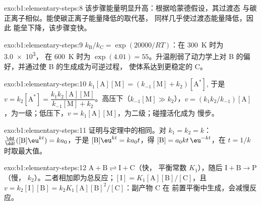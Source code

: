 \begin{solution}{exo:b1:elementary-steps:8}
该步骤能量明显升高：根据哈蒙德假设，其过渡态
与碳正离子相似。能使碳正离子能量降低的取代基，
同样几乎使过渡态能量降低，因此
能垒下降，该步骤变快。
\end{solution}

\begin{solution}{exo:b1:elementary-steps:9}
$k_{\mathrm B}/k_{\mathrm C} = \exp(20000/RT)$：在 \qty{300}{K} 时为 \num{3.0e3}，
在 \qty{600}{K} 时为 $\exp(4.01) = 55$。升温削弱了动力学上对
B 的偏好，并通过使 B 的生成成为可逆过程，
使体系达到更稳定的 C。
\end{solution}

\begin{solution}{exo:b1:elementary-steps:10}
$k_1[\mathrm{A}][\mathrm{M}] = (k_{-1}[\mathrm{M}] + k_2)[\mathrm{A}^*]$,
于是 $v = k_2[\mathrm{A}^*] = \dfrac{k_1k_2[\mathrm{A}][\mathrm{M}]}{k_{-1}[\mathrm{M}]
+ k_2}$。高压下（$k_{-1}[\mathrm{M}] \gg k_2$），$v =
(k_1k_2/k_{-1})[\mathrm{A}]$，为一级；低压下，$v =
k_1[\mathrm{A}][\mathrm{M}]$，为二级；碰撞活化成为
慢步。
\end{solution}

\begin{solution}{exo:b1:elementary-steps:11}
证明与定理中的相同。对 $k_1 = k_2 = k$：
$\frac{\dd}{\dd t}([\mathrm{B}]\eu^{kt}) = ka_0$，于是 $[\mathrm{B}]\eu^{kt} =
ka_0t$，得 $[\mathrm{B}] = a_0kt\,\eu^{-kt}$，在 $t = 1/k$ 时取最大值。
\end{solution}

\begin{solution}{exo:b1:elementary-steps:12}
$\mathrm{A} + \mathrm{B} \rightleftharpoons \mathrm{I} + \mathrm{C}$（快，
平衡常数 $K_1$），随后 $\mathrm{I} + \mathrm{B} \to \mathrm{P}$（慢，
$k_2$）。二者相加即为总反应；$[\mathrm{I}] =
K_1[\mathrm{A}][\mathrm{B}]/[\mathrm{C}]$，且 $v = k_2[\mathrm{I}][\mathrm{B}]
= k_2K_1[\mathrm{A}][\mathrm{B}]^2/[\mathrm{C}]$：副产物 C 在
前置平衡中生成，会减慢反应。
\end{solution}

